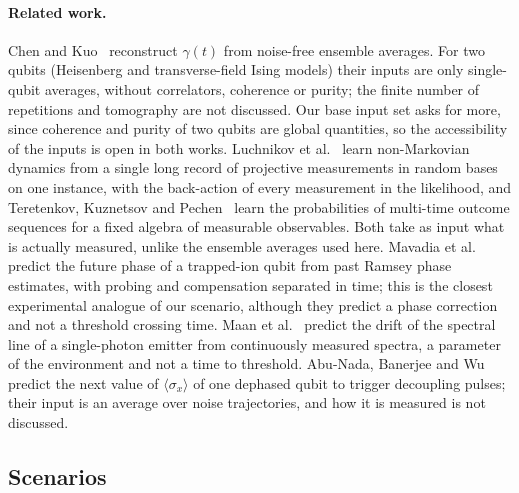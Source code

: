\documentclass[twocolumn,10pt]{article}
\begin{document}
\paragraph{Related work.}
Chen and Kuo~\cite{TransformerLindblad2025} reconstruct $\gamma(t)$ from
noise-free ensemble averages. For two qubits (Heisenberg and transverse-field
Ising models) their inputs are only single-qubit averages, without
correlators, coherence or purity; the finite number of repetitions and
tomography are not discussed. Our base input set asks for more, since
coherence and purity of two qubits are global quantities, so the
accessibility of the inputs is open in both works.
Luchnikov et al.~\cite{Luchnikov2020} learn non-Markovian dynamics from a
single long record of projective measurements in random bases on one
instance, with the back-action of every measurement in the likelihood,
and Teretenkov, Kuznetsov and Pechen~\cite{Teretenkov2026} learn the
probabilities of multi-time outcome sequences for a fixed algebra of
measurable observables. Both take as input what is actually measured,
unlike the ensemble averages used here.
Mavadia et al.~\cite{Mavadia2017} predict the future phase of a trapped-ion
qubit from past Ramsey phase estimates, with probing and compensation
separated in time; this is the closest experimental analogue of our
scenario, although they predict a phase correction and not a threshold
crossing time. Maan et al.~\cite{Maan2026} predict the drift of the
spectral line of a single-photon emitter from continuously measured
spectra, a parameter of the environment and not a time to threshold.
Abu-Nada, Banerjee and Wu~\cite{AbuNada2026} predict the next value of
$\langle\sigma_x\rangle$ of one dephased qubit to trigger decoupling
pulses; their input is an average over noise trajectories, and how it is
measured is not discussed.

\subsection*{Scenarios}
\end{document}
